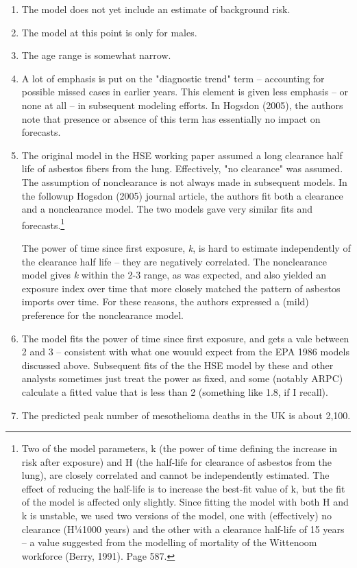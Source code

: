 \documentclass{article}\usepackage{graphicx, color}
\begin{document}
\begin{enumerate}
  \item The model does not yet include an estimate of background risk.
  \item The model at this point is only for males.
  \item The age range is somewhat narrow.
  \item A lot of emphasis is put on the "diagnostic trend" term -- accounting for possible missed cases in earlier years.  This element is given less emphasis -- or none at all -- in subsequent modeling efforts.  In Hogsdon (2005), the authors note that presence or absence of this term has essentially no impact on forecasts.
  \item The original model in the HSE working paper assumed a long clearance half life of asbestos fibers from the lung.  Effectively, "no clearance" was assumed.  The assumption of nonclearance is not always made in subsequent models.  In the followup Hogsdon (2005) journal article, the authors fit both a clearance and a nonclearance model.  The two models gave very similar fits and forecasts.\footnote{Two of the model
parameters, k (the power of time defining the increase in risk
after exposure) and H (the half-life for clearance of asbestos from
the lung), are closely correlated and cannot be independently
estimated. The effect of reducing the half-life is to increase the
best-fit value of k, but the fit of the model is affected only slightly.
Since fitting the model with both H and k is unstable, we used two
versions of the model, one with (effectively) no clearance
(H¼1000 years) and the other with a clearance half-life of 15
years – a value suggested from the modelling of mortality of the
Wittenoom workforce (Berry, 1991).  Page 587.} 
  
The power of time since first exposure, \emph{k}, is hard to estimate independently of the clearance half life -- they are negatively correlated.  The nonclearance model gives \emph{k} within the 2-3 range, as was expected, and also yielded an exposure index over time that more closely matched the pattern of asbestos imports over time.  For these reasons, the authors expressed a (mild) preference for the nonclearance model. 
  \item The model fits the power of time since first exposure, and gets a vale between 2 and 3 -- consistent with what one wouuld expect from the EPA 1986 models discussed above.  Subsequent fits of the the HSE model by these and other analysts sometimes just treat the power as fixed, and some (notably ARPC) calculate a fitted value that is less than 2 (something like 1.8, if I recall).
  \item The predicted peak number of mesothelioma deaths in the UK is about 2,100.
\end{enumerate}
\end{document}
